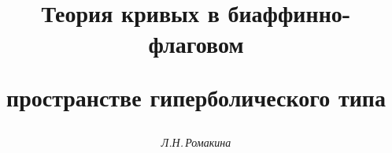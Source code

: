 

 




 


\newcommand{\BH}{\text{\it Б}^{\text{\it г}}_4} 




\newcommand{\tts}[1]{} 


 




  


\setcounter{page}{83} 












 


\author{\it Л.Н.\,Ромакина} 




\title{Теория кривых в биаффинно-флаговом  


пространстве гиперболического типа} 


 


\date{} 




\pagestyle{plain} %


 




\maketitle 


